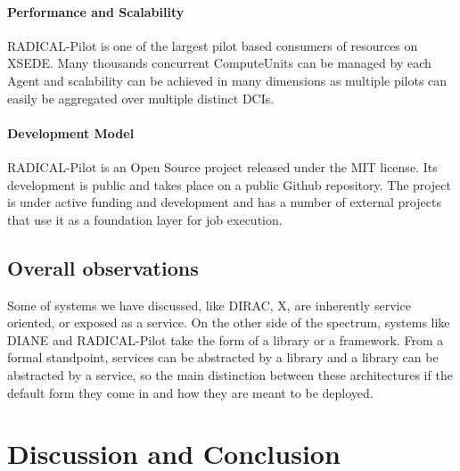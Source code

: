 \documentclass{sig-alternate}
\begin{document}
\paragraph{Performance and Scalability}

RADICAL-Pilot is one of the largest pilot based consumers of resources on
XSEDE\cite{}. Many thousands concurrent ComputeUnits can be managed by each
\pilot Agent and scalability can be achieved in many dimensions as multiple
pilots can easily be aggregated over multiple distinct DCIs.

\paragraph{Development Model}

RADICAL-Pilot is an Open Source project released under the MIT license. Its
development is public and takes place on a public Github repository. The
project is under active funding and development and has a number of external
projects that use it as a foundation layer for job execution.


%
%
\subsection{Overall observations}


Some of systems we have discussed, like DIRAC, X, are inherently service
oriented, or exposed as a service. On the other side of the spectrum, systems
like DIANE and RADICAL-Pilot take the form of a library or a framework. From a
formal standpoint, services can be abstracted by a library and a library can be
abstracted by a service, so the main distinction between these architectures if
the default form they come in and how they are meant to be deployed.


%
\section{Discussion and Conclusion}
\label{sec:5}

\end{document}
